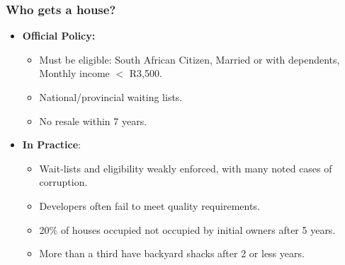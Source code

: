 \documentclass[aspectratio=32]{beamer}
\begin{document}
\begin{frame}
\frametitle{Who gets a house?}
  \begin{itemize}
    \item<1-> {\bf Official Policy:}
    \vspace{2mm} 
      \begin{itemize}
        \item Must be eligible: South African Citizen, Married or with dependents, Monthly income $<$ R3,500.
        \vspace{1mm}
        \item National/provincial waiting lists.
        \vspace{1mm}
        \item No resale within 7 years.
      \end{itemize}
    \vspace{2mm}
    \item<2-> {\bf In Practice}:
      \begin{itemize}
        \vspace{2mm} 
        \item Wait-lists and eligibility weakly enforced, with many noted cases of corruption.
        \vspace{1mm}
        \item Developers often fail to meet quality requirements.
        \vspace{1mm}
        \item 20\% of houses occupied not occupied by initial owners after 5 years.
        \vspace{1mm}
        \item More than a third have backyard shacks after 2 or less years.
      \end{itemize}
  \end{itemize}

\end{frame}

\end{document}
